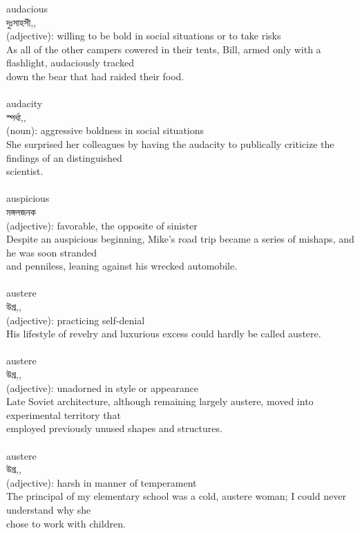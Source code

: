 \documentclass{article}
\begin{document}
{audacious}\\
{দুঃসাহসী,,}\\
{(adjective): willing to be bold in social situations or to take risks\\As all of the other campers cowered in their tents, Bill, armed only with a flashlight, audaciously tracked\\down the bear that had raided their food.\\}\\
{audacity}\\
{স্পর্ধা,,}\\
{(noun): aggressive boldness in social situations\\She surprised her colleagues by having the audacity to publically criticize the findings of an distinguished\\scientist.\\}\\
{auspicious}\\
{মঙ্গলজনক}\\
{(adjective): favorable, the opposite of sinister\\Despite an auspicious beginning, Mike's road trip became a series of mishaps, and he was soon stranded\\and penniless, leaning against his wrecked automobile.\\}\\
{austere}\\
{উগ্র,,}\\
{(adjective): practicing self-denial\\His lifestyle of revelry and luxurious excess could hardly be called austere.\\}\\
{austere}\\
{উগ্র,,}\\
{(adjective): unadorned in style or appearance\\Late Soviet architecture, although remaining largely austere, moved into experimental territory that\\employed previously unused shapes and structures.\\}\\
{austere}\\
{উগ্র,,}\\
{(adjective): harsh in manner of temperament\\The principal of my elementary school was a cold, austere woman; I could never understand why she\\chose to work with children.\\}\\
\end{document}
